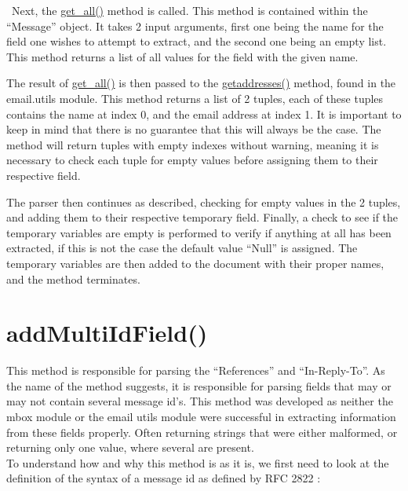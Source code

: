 \documentclass[a4paper,english]{report}
\begin{document}


\noindent\
Next, the \url{get_all()} method is called. This method is contained within the “Message” object. It takes 2 input arguments, first one being the name for the field one wishes to attempt to extract, and the second one being an empty list.
This method returns a list of all values for the field with the given name.

The result of \url{get_all()} is then passed to the \url{getaddresses()} method, found in the email.utils module.
This method returns a list of 2 tuples, each of these tuples contains the name at index 0, and the email address at index 1. It is important to keep in mind that there is no guarantee that this will always be the case. The method will return tuples with empty indexes without warning, meaning it is necessary to check each tuple for empty values before assigning them to their respective field. 




The parser then continues as described, checking for empty values in the 2 tuples, and adding them to their respective temporary field. Finally, a check to see if the temporary variables are empty is performed to verify if anything at all has been extracted, if this is not the case the default value “Null” is assigned. The temporary variables are then added to the document with their proper names, and the method terminates.



\section{addMultiIdField()}

This method is responsible for parsing the “References” and “In-Reply-To”. As the name of the method suggests, it is responsible for parsing fields that may or may not contain several message id’s. This method was developed as neither the mbox module or the email utils module were successful in extracting information from these fields properly. Often returning strings that were either malformed, or returning only one value, where several are present. \\


To understand how and why this method is as it is, we first need to look at the definition of the syntax of a message id as defined by RFC 2822 \cite{RFC2822}:\\
	
\end{document}
